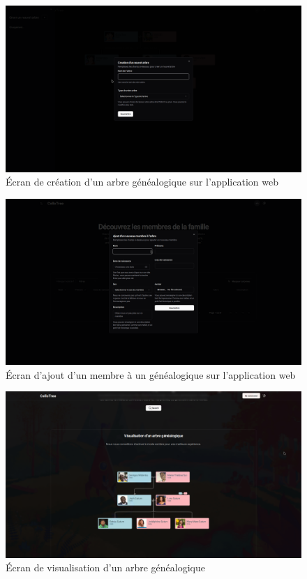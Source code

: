 \begin{figure}[H]
  \centering
  \includegraphics[width=1\textwidth]{capture/tree.png}
  \caption{Écran de création d'un arbre généalogique sur l'application web}
\end{figure}

\begin{figure}[H]
  \centering
  \includegraphics[width=1\textwidth]{capture/member.png}
  \caption{Écran d'ajout d'un membre à un généalogique sur l'application web}
\end{figure}

\begin{figure}[H]
  \centering
  \includegraphics[width=1\textwidth]{capture/view.png}
  \caption{Écran de visualisation d'un arbre généalogique}
\end{figure}


